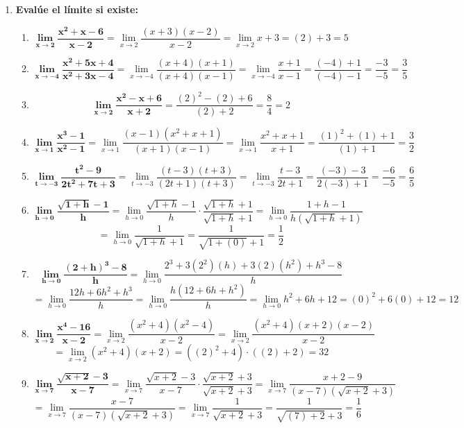 \documentclass[12pt]{article}
\begin{document}
\begin{enumerate}[label=\textbf{\arabic*.}]
            
            \vspace{1cm}\hrule
            \item \textbf{Evalúe el límite si existe:}
                \begin{enumerate}[label=\textbf{\arabic*)}] 
                    \item \[\bm{\lim_{x \to 2} \frac{x ^2 + x - 6}{x - 2}} = \lim_{x \to 2} \frac{(x + 3)(x - 2)}{x - 2} = \lim_{x \to 2} x + 3 = (2) + 3 = 5\]
                    \item \[\bm{\lim_{x \to -4} \frac{x ^2 + 5x +4}{x ^2 + 3x - 4}} = \lim_{x \to -4} \frac{(x + 4)(x + 1)}{(x + 4)(x - 1)} = \lim_{x \to -4} \frac{x + 1}{x - 1} = \frac{(-4) + 1}{(-4) - 1} = \frac{-3}{-5} = \frac{3}{5}\]
                    \item \[\bm{\lim_{x \to 2} \frac{x ^2 - x + 6}{x + 2}} = \frac{(2)^2 - (2) + 6}{(2) + 2} = \frac{8}{4} = 2\]     
                    \item \[\bm{\lim_{x \to 1} \frac{x ^3 - 1}{x ^2 - 1}} = \lim_{x \to 1} \frac{(x - 1)(x^2 + x + 1)}{(x + 1)(x - 1)} = \lim_{x \to 1} \frac{x^2 + x + 1}{x + 1} = \frac{(1)^2 + (1) + 1}{(1) + 1} = \frac{3}{2}\]
                    \item \[\bm{\lim_{t \to -3} \frac{t ^2 - 9}{2t ^2 + 7t + 3}} = \lim_{t \to -3} \frac{(t - 3)(t + 3)}{(2t + 1)(t + 3)} = \lim_{t \to -3} \frac{t - 3}{2t + 1} = \frac{(-3) - 3}{2(-3) + 1} = \frac{-6}{-5} = \frac{6}{5}\]
                    \item \[\bm{\lim_{h \to 0} \frac{\sqrt{1 + h} - 1}{h}} = \lim_{h \to 0} \frac{\sqrt{1 + h} - 1}{h} \cdot \frac{\sqrt{1 + h} + 1}{\sqrt{1 + h} + 1} = \lim_{h \to 0} \frac{1 + h - 1}{h(\sqrt{1 + h} + 1)}\] \[= \lim_{h \to 0} \frac{1}{\sqrt{1 + h} + 1} = \frac{1}{\sqrt{1 + (0)} + 1} = \frac{1}{2}\] 
                    \item \[\bm{\lim_{h \to 0} \frac{(2 + h) ^3 - 8}{h}} = \lim_{h \to 0} \frac{2^3 + 3(2^2)(h) + 3(2)(h^2) + h^3 - 8}{h}\] \[= \lim_{h \to 0} \frac{12h + 6h^2 + h^3}{h} = \lim_{h \to 0} \frac{h(12 + 6h + h^2)}{h} = \lim_{h \to 0} h^2 + 6h + 12 = (0)^2 + 6(0) + 12 = 12\]
                    \item \[\bm{\lim_{x \to 2} \frac{x ^4 - 16}{x - 2}} = \lim_{x \to 2} \frac{(x^2 + 4)(x^2 - 4)}{x - 2} = \lim_{x \to 2} \frac{(x^2 + 4)(x + 2)(x - 2)}{x - 2}\] \[= \lim_{x \to 2} (x^2 + 4)(x + 2) = ((2)^2 + 4) \cdot ((2) + 2) = 32\]
                    \item \[\bm{\lim_{x \to 7} \frac{\sqrt{x + 2} - 3}{x - 7}} = \lim_{x \to 7} \frac{\sqrt{x + 2} - 3}{x - 7} \cdot \frac{\sqrt{x + 2} + 3}{\sqrt{x + 2} + 3} =  \lim_{x \to 7} \frac{x + 2 - 9}{(x - 7)(\sqrt{x + 2} + 3)}\] \[=  \lim_{x \to 7} \frac{x - 7}{(x - 7)(\sqrt{x + 2} + 3)} = \lim_{x \to 7} \frac{1}{\sqrt{x + 2} + 3} = \frac{1}{\sqrt{(7)+ 2} + 3} = \frac{1}{6}\]

\end{enumerate}
\end{enumerate}
\end{document}
